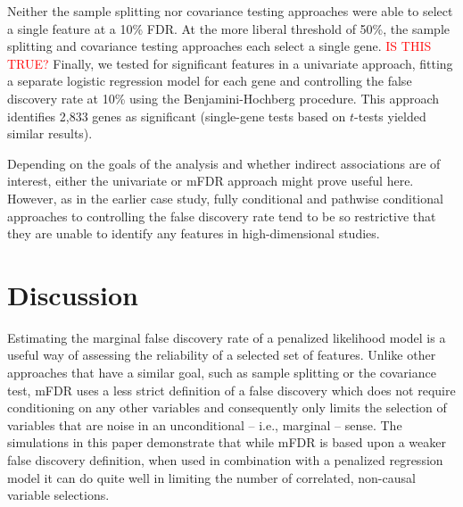Neither the sample splitting nor covariance testing approaches were able to select a single feature at a 10\% FDR.
At the more liberal threshold of 50\%, the sample splitting and covariance testing approaches each select a single gene.
\textcolor{red}{IS THIS TRUE?}
Finally, we tested for significant features in a univariate approach, fitting a separate logistic regression model for each gene and controlling the false discovery rate at 10\% using the Benjamini-Hochberg procedure.
This approach identifies 2,833 genes as significant (single-gene tests based on $t$-tests yielded similar results).

Depending on the goals of the analysis and whether indirect associations are of interest, either the univariate or mFDR approach might prove useful here.
However, as in the earlier case study, fully conditional and pathwise conditional approaches to controlling the false discovery rate tend to be so restrictive that they are unable to identify any features in high-dimensional studies.

\section{Discussion}

Estimating the marginal false discovery rate of a penalized likelihood model is a useful way of assessing the reliability of a selected set of features. Unlike other approaches that have a similar goal, such as sample splitting or the covariance test, mFDR uses a less strict definition of a false discovery which does not require conditioning on any other variables and consequently only limits the selection of variables that are noise in an unconditional -- i.e., marginal -- sense.  The simulations in this paper demonstrate that while mFDR is based upon a weaker false discovery definition, when used in combination with a penalized regression model it can do quite well in limiting the number of correlated, non-causal variable selections.

